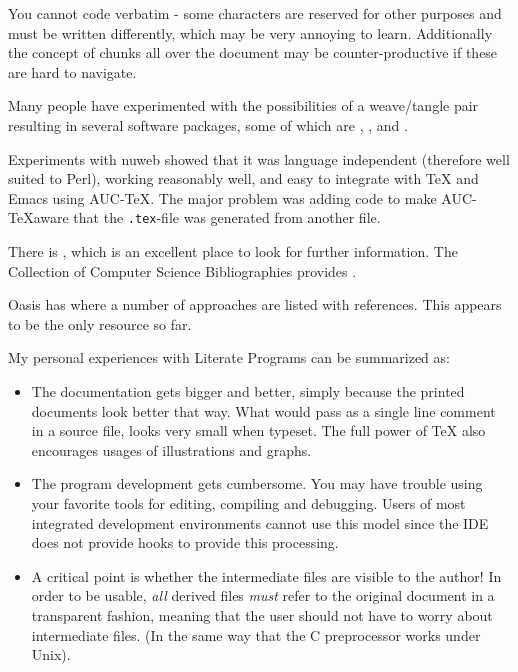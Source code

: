 You cannot code verbatim - some characters are reserved for other
purposes and must be written differently, which may be very annoying
to learn.  Additionally the concept of chunks all over the document
may be counter-productive if these are hard to navigate.

Many people have experimented with the possibilities of a weave/tangle
pair resulting in several software packages, some of which are
,
,
 and
.

Experiments with nuweb showed that it was language
independent (therefore well suited to Perl), working
reasonably well, and easy to integrate with {\TeX} and Emacs
using AUC-\TeX.  The major problem was adding code to make
AUC-\TeX aware that the \texttt{.tex}-file was generated
from another file.

There is
, which is an excellent place to
look for further information.  The Collection of Computer Science
Bibliographies provides
.

Oasis has  where a number of
approaches are listed with references.  This appears to be the only
resource so far.

My personal experiences with Literate Programs can be summarized as:

\begin{itemize}
\item The documentation gets bigger and better, simply because the
  printed documents look better that way.  What would pass as a single
  line comment in a source file, looks very small when typeset.  The
  full power of {\TeX} also encourages usages of illustrations and
  graphs.

\item The program development gets cumbersome.  You may have trouble
  using your favorite tools for editing, compiling and debugging.
  Users of most integrated development environments cannot use this
  model since the IDE does not provide hooks to provide this
  processing.

\item

  A critical point is whether the intermediate files are visible to
  the author! In order to be usable, \textit{all} derived files
  \textit{must} refer to the original document in a transparent
  fashion, meaning that the user should not have to worry about
  intermediate files.  (In the same way that the C preprocessor works
  under Unix).
\end{itemize}

